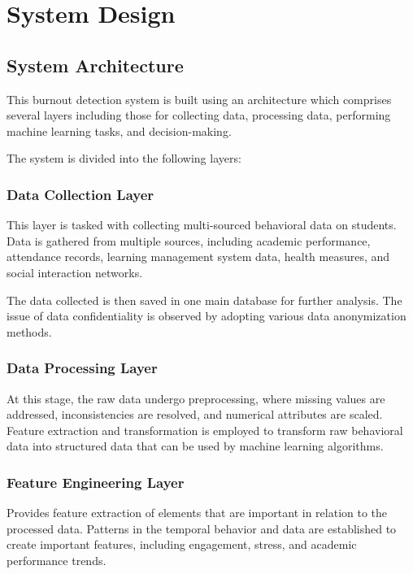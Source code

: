 \chapter{System Design}

\section{System Architecture}

This burnout detection system is built using an architecture which comprises several layers including those for collecting data, processing data, performing machine learning tasks, and decision-making.

The system is divided into the following layers: 

\subsection{Data Collection Layer}

This layer is tasked with collecting multi-sourced behavioral data on students. Data is gathered from multiple sources, including academic performance, attendance records, learning management system data, health measures, and social interaction networks.

The data collected is then saved in one main database for further analysis. The issue of data confidentiality is observed by adopting various data anonymization methods.

\subsection{Data Processing Layer}

At this stage, the raw data undergo preprocessing, where missing values are addressed, inconsistencies are resolved, and numerical attributes are scaled. 
Feature extraction and transformation is employed to transform raw behavioral data into structured data that can be used by machine learning algorithms.

\subsection{Feature Engineering Layer}

Provides feature extraction of elements that are important in relation to the processed data. Patterns in the temporal behavior and data are established to create important features, including engagement, stress, and academic performance trends.

